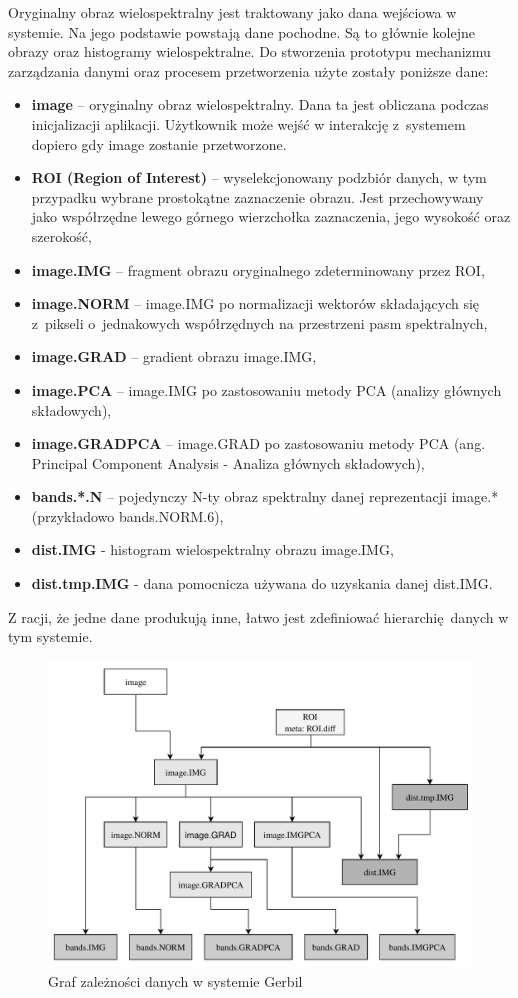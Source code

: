 Oryginalny obraz wielospektralny jest traktowany jako dana wejściowa w systemie. Na jego podstawie powstają dane pochodne. Są to głównie kolejne obrazy oraz histogramy wielospektralne. Do stworzenia prototypu mechanizmu zarządzania danymi oraz procesem przetworzenia użyte zostały poniższe dane:
\begin{itemize}
	\item {} \textbf{image} -- oryginalny obraz wielospektralny. Dana ta jest obliczana podczas inicjalizacji aplikacji. Użytkownik może wejść w interakcję z~systemem dopiero gdy image zostanie przetworzone.
	\item {} \textbf{ROI (Region of Interest)} -- wyselekcjonowany podzbiór danych, w tym przypadku wybrane prostokątne zaznaczenie obrazu. Jest przechowywany jako współrzędne lewego górnego wierzchołka zaznaczenia, jego wysokość oraz szerokość,
	\item {} \textbf{image.IMG} -- fragment obrazu oryginalnego zdeterminowany przez ROI,
	\item {} \textbf{image.NORM} -- image.IMG po normalizacji wektorów składających się z~pikseli o~jednakowych współrzędnych na przestrzeni pasm spektralnych,
	\item {} \textbf{image.GRAD} -- gradient obrazu image.IMG,
	\item {} \textbf{image.PCA} -- image.IMG po zastosowaniu metody PCA (analizy głównych składowych),
	\item {} \textbf{image.GRADPCA} -- image.GRAD po zastosowaniu metody PCA (ang. Principal Component Analysis - Analiza głównych składowych)\cite{PCA},
	\item {} \textbf{bands.*.N} -- pojedynczy N-ty obraz spektralny danej reprezentacji image.* (przykładowo bands.NORM.6),
	\item {} \textbf{dist.IMG} - histogram wielospektralny obrazu image.IMG,
	\item {} \textbf{dist.tmp.IMG} - dana pomocnicza używana do uzyskania danej dist.IMG. 
\end{itemize}
Z racji, że jedne dane produkują inne, łatwo jest zdefiniować hierarchię danych w tym systemie.

\begin{figure}[ht]
	\centering
		\includegraphics[width=0.7\linewidth]{rys02/data-dependencies}
	\caption{Graf zależności danych w systemie Gerbil}
	\label{fig:data-dependencies}	
\end{figure}

